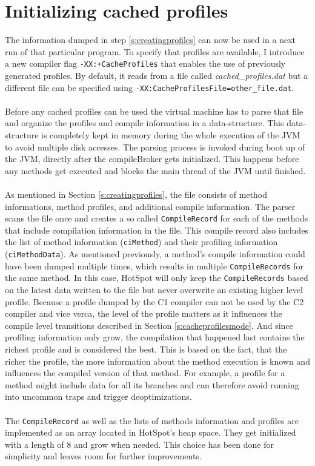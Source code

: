 \section{Initializing cached profiles}
\label{s:initializingprofiles}
The information dumped in step \ref{s:creatingprofiles} can now be used in a next run of that particular program.
To specify that profiles are available, I introduce a new compiler flag \texttt{-XX:+CacheProfiles} that enables the use of previously generated profiles. By default, it reads from a file called \textit{cached\_profiles.dat} but a different file can be specified using \texttt{-XX:CacheProfilesFile=other\_file.dat}.
\\\\
Before any cached profiles can be used the virtual machine has to parse that file and organize the profiles and compile information in a data-structure. This data-structure is completely kept in memory during the whole execution of the JVM to avoid multiple disk accesses.
The parsing process is invoked during boot up of the JVM, directly after the compileBroker gets initialized. This happens before any methods get executed and blocks the main thread of the JVM until finished.
\\\\
As mentioned in Section \ref{s:creatingprofiles}, the file consists of method informations, method profiles, and additional compile information. The parser scans the file once and creates a so called \texttt{CompileRecord} for each of the methods that include compilation information in the file. This compile record also includes the list of method information (\texttt{ciMethod}) and their profiling information (\texttt{ciMethodData}).
As mentioned previously, a method's compile information could have been dumped multiple times, which results in multiple \texttt{CompileRecords} for the same method. In this case, HotSpot will only keep the \texttt{CompileRecords} based on the latest data written to the file but never overwrite an existing higher level profile.
Because a profile dumped by the C1 compiler can not be used by the C2 compiler and vice verca, the level of the profile matters as it influences the compile level transitions described in Section \ref{s:cacheprofilesmode}.
And since profiling information only grow, the compilation that happened last contains the richest profile and is considered the best.
This is based on the fact, that the richer the profile, the more information about the method execution is known and influences the compiled version of that method. For example, a profile for a method might include data for all its branches and can therefore avoid running into uncommon traps and trigger deoptimizations.
\\\\
The \texttt{CompileRecord} as well as the lists of methods information and profiles are implemented as an array located in HotSpot's heap space.
They get initialized with a length of 8 and grow when needed. This choice has been done for simplicity and leaves room for further improvements.

